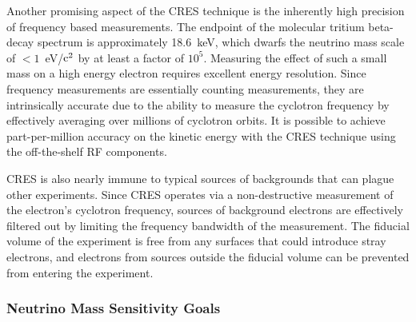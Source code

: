 Another promising aspect of the CRES technique is the inherently high precision of frequency based measurements. The endpoint of the molecular tritium beta-decay spectrum is approximately 18.6~keV, which dwarfs the neutrino mass scale of $<1$~eV/$\rm{c}^2$ by at least a factor of $10^5$. Measuring the effect of such a small mass on a high energy electron requires excellent energy resolution. Since frequency measurements are essentially counting measurements, they are intrinsically accurate due to the ability to measure the cyclotron frequency by effectively averaging over millions of cyclotron orbits. It is possible to achieve part-per-million accuracy on the kinetic energy with the CRES technique using the off-the-shelf RF components.

CRES is also nearly immune to typical sources of backgrounds that can plague other experiments. Since CRES operates via a non-destructive measurement of the electron's cyclotron frequency, sources of background electrons are effectively filtered out by limiting the frequency bandwidth of the measurement. The fiducial volume of the experiment is free from any surfaces that could introduce stray electrons, and electrons from sources outside the fiducial volume can be prevented from entering the experiment.

\subsubsection*{Neutrino Mass Sensitivity Goals}

